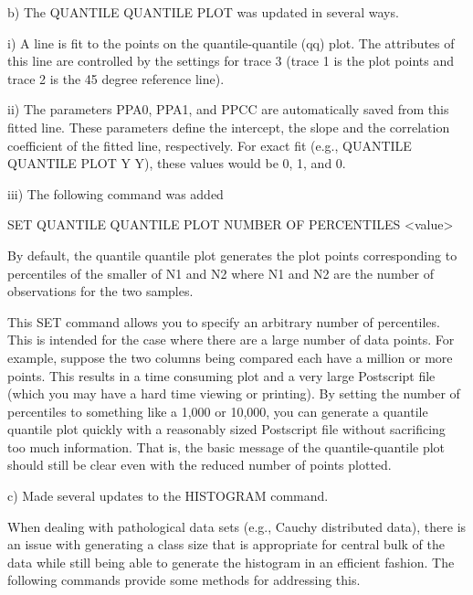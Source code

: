     b) The QUANTILE QUANTILE PLOT was updated in several ways.

          i) A line is fit to the points on the quantile-quantile (qq)
             plot.  The attributes of this line are controlled by the
             settings for trace 3 (trace 1 is the plot points and trace 2
             is the 45 degree reference line).

         ii) The parameters PPA0, PPA1, and PPCC are automatically saved
             from this fitted line.  These parameters define the intercept,
             the slope and the correlation coefficient of the fitted line,
             respectively.  For exact fit (e.g.,
             QUANTILE QUANTILE PLOT Y Y), these values would be 0, 1, and
             0.

        iii) The following command was added

                SET QUANTILE QUANTILE PLOT NUMBER OF PERCENTILES <value>

             By default, the quantile quantile plot generates the plot
             points corresponding to percentiles of the smaller of N1
             and N2 where N1 and N2 are the number of observations for
             the two samples.

             This SET command allows you to specify an arbitrary number
             of percentiles.  This is intended for the case where there
             are a large number of data points.  For example, suppose
             the two columns being compared each have a million or more
             points.  This results in a time consuming plot and a very
             large Postscript file (which you may have a hard time
             viewing or printing).  By setting the number of percentiles
             to something like a 1,000 or 10,000, you can generate a
             quantile quantile plot quickly with a reasonably sized
             Postscript file without sacrificing too much information.
             That is, the basic message of the quantile-quantile plot
             should still be clear even with the reduced number of
             points plotted.

    c) Made several updates to the HISTOGRAM command.

       When dealing with pathological data sets (e.g., Cauchy distributed
       data), there is an issue with generating a class size that is
       appropriate for central bulk of the data while still being able
       to generate the histogram in an efficient fashion.  The following
       commands provide some methods for addressing this.

